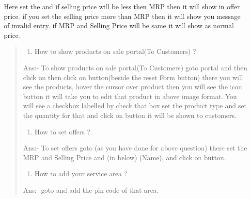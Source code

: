 \documentclass[a4paper,10pt,english]{report}
\begin{document}
Here set the  and  if selling price will be less then MRP then it will show in offer price. if you set the selling price more than MRP then it will show you message of invalid entry. if MRP and Selling Price will be same it will show as normal price.
\begin{quote}
\begin{enumerate}
\def\theenumi{\arabic{enumi}}
\def\labelenumi{\theenumi .}
\makeatletter\def\p@enumii{\p@enumi \theenumi .}\makeatother
\setcounter{enumi}{16}
\item {} 
How to show products on sale portal(To Customers) ?

\end{enumerate}

Ans:- To show products on sale portal(To Customers) goto  portal and then click on  then click on  button(beside the reset Form button) there you will see the products, hover the cursor over product then you will see the  icon button it will take you to edit that product in above image format. You will see a checkbox labelled by  check that box set the product type and set the quantity for that and click on  button it will be shown to customers.
\begin{enumerate}
\def\theenumi{\arabic{enumi}}
\def\labelenumi{\theenumi .}
\makeatletter\def\p@enumii{\p@enumi \theenumi .}\makeatother
\setcounter{enumi}{17}
\item {} 
How to set offers ?

\end{enumerate}

Ans:- To set offers goto  (as you have done for above question) there set the MRP and Selling Price and (in below)  (Name),  and click on  button.
\begin{enumerate}
\def\theenumi{\arabic{enumi}}
\def\labelenumi{\theenumi .}
\makeatletter\def\p@enumii{\p@enumi \theenumi .}\makeatother
\setcounter{enumi}{18}
\item {} 
How to add  your service area ?

\end{enumerate}

Ans:- goto {\hyperref[\detokenize{configure:id7}]{}} and add the pin code of that area.
\end{quote}
\end{document}
